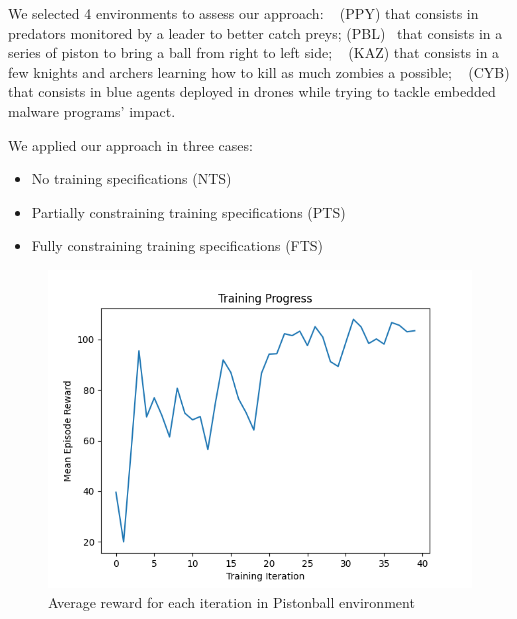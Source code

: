 \documentclass[runningheads]{llncs}
\begin{document}




We selected 4 environments to assess our approach: ~\cite{Lowe2017} (PPY) that consists in predators monitored by a leader to better catch preys;  (PBL)~\cite{Terry2021} that consists in a series of piston to bring a ball from right to left side; ~\cite{Terry2021} (KAZ) that consists in a few knights and archers learning how to kill as much zombies a possible; ~\cite{cage_challenge_3_announcement} (CYB) that consists in blue agents deployed in drones while trying to tackle embedded malware programs' impact.

We applied our approach in three cases:
\begin{itemize}
    \item No training specifications (NTS)
    \item Partially constraining training specifications (PTS)
    \item Fully constraining training specifications (FTS)
\end{itemize}

\begin{figure}[h!]
    \centering
    \includegraphics[width=\textwidth]{figures/prahom_learning_curve.png}
    \caption{Average reward for each iteration in Pistonball environment}
    \label{fig:prahom_learning_curve}
\end{figure}
\end{document}
